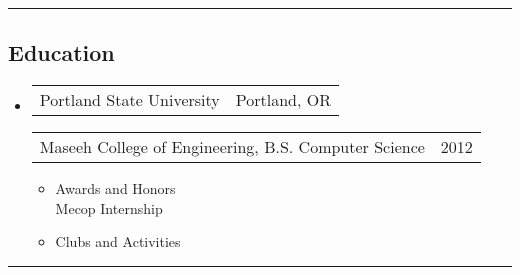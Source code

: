 \documentclass[10pt,letterpaper]{article}
\author{Eric Dinger}
\makeatletter
\newcommand{\heading}[2]
{\begin{tabular*}{\linewidth}{l@{\extracolsep{\fill}}r}
#1 &
#2 \\
\end{tabular*}}
\makeatother
\begin{document}
 \renewcommand*\arraystretch{1.5}


\vspace{.2em}
\hrule
\vspace{-.2em}

\subsection*{Education}
	\begin{itemize}
	\item
		\heading
			{Portland State University}
			{Portland, OR}
		\heading 
			{Maseeh College of Engineering, B.S. Computer Science}
			{2012}
		\begin{itemize}
			\item Awards and Honors \\
			Mecop Internship
			\item Clubs and Activities \\
		\end{itemize}
	\end{itemize}

\hrule
\end{document}
